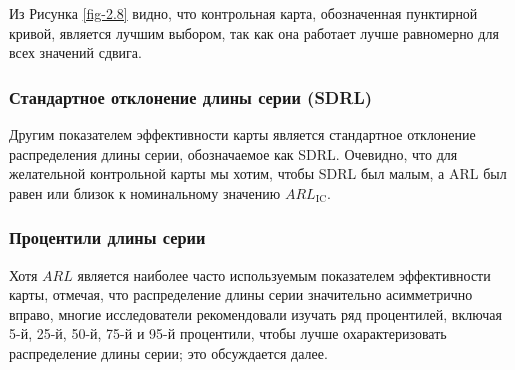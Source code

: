 Из Рисунка \ref{fig-2.8} видно, что контрольная карта, обозначенная пунктирной кривой, является лучшим выбором, так как она работает лучше равномерно для всех значений сдвига.

\subsubsection{Стандартное отклонение длины серии (SDRL)}

Другим показателем эффективности карты является стандартное отклонение распределения длины серии, обозначаемое как SDRL. Очевидно, что для желательной контрольной карты мы хотим, чтобы SDRL был малым, а ARL был равен или близок к номинальному значению \(ARL_{\text{IC}}\).

\subsubsection{Процентили длины серии}

Хотя \(ARL\) является наиболее часто используемым показателем эффективности карты, отмечая, что распределение длины серии значительно асимметрично вправо, многие исследователи рекомендовали изучать ряд процентилей, включая 5-й, 25-й, 50-й, 75-й и 95-й процентили, чтобы лучше охарактеризовать распределение длины серии; это обсуждается далее.

